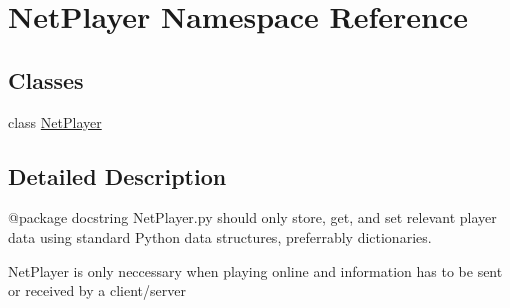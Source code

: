 \hypertarget{namespace_net_player}{}\section{Net\+Player Namespace Reference}
\label{namespace_net_player}
\subsection*{Classes}
\begin{DoxyCompactItemize}
\item 
class \hyperlink{class_net_player_1_1_net_player}{Net\+Player}
\end{DoxyCompactItemize}


\subsection{Detailed Description}
\begin{DoxyVerb}@package docstring
NetPlayer.py should only store, get, and set relevant player data using standard
Python data structures, preferrably dictionaries.

NetPlayer is only neccessary when playing online and information has to be sent
or received by a client/server
\end{DoxyVerb}
 